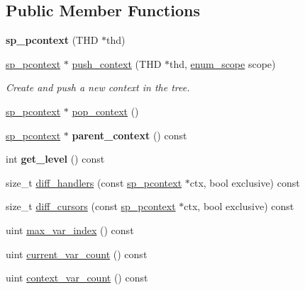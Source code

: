 \subsection*{Public Member Functions}
\begin{DoxyCompactItemize}
\item 
\mbox{\label{classsp__pcontext_a0185ee1d6e0b39b105e360779f46ae90}} 
{\bfseries sp\+\_\+pcontext} (T\+HD $\ast$thd)
\item 
\mbox{\hyperlink{classsp__pcontext}{sp\+\_\+pcontext}} $\ast$ \mbox{\hyperlink{classsp__pcontext_a486b4feb63c343fea40adcf197bde017}{push\+\_\+context}} (T\+HD $\ast$thd, \mbox{\hyperlink{classsp__pcontext_a6252258e34c191cbf1b5e86628cd29c6}{enum\+\_\+scope}} scope)
\begin{DoxyCompactList}\small\item\em Create and push a new context in the tree. \end{DoxyCompactList}\item 
\mbox{\hyperlink{classsp__pcontext}{sp\+\_\+pcontext}} $\ast$ \mbox{\hyperlink{classsp__pcontext_ae7e4af2bd11d58a2950462a490612a31}{pop\+\_\+context}} ()
\item 
\mbox{\label{classsp__pcontext_af7e13090fdd0afca3396677eb805ab63}} 
\mbox{\hyperlink{classsp__pcontext}{sp\+\_\+pcontext}} $\ast$ {\bfseries parent\+\_\+context} () const
\item 
\mbox{\label{classsp__pcontext_aad5e1160cd57d70ff16ee6aa8288744d}} 
int {\bfseries get\+\_\+level} () const
\item 
size\+\_\+t \mbox{\hyperlink{classsp__pcontext_ae47ee327ab468137d802f15dafe35206}{diff\+\_\+handlers}} (const \mbox{\hyperlink{classsp__pcontext}{sp\+\_\+pcontext}} $\ast$ctx, bool exclusive) const
\item 
size\+\_\+t \mbox{\hyperlink{classsp__pcontext_a1bed00024e865ddb21bfb40bd3383d70}{diff\+\_\+cursors}} (const \mbox{\hyperlink{classsp__pcontext}{sp\+\_\+pcontext}} $\ast$ctx, bool exclusive) const
\item 
uint \mbox{\hyperlink{classsp__pcontext_a8e102fc7e3bb76e872b32bb8783df72f}{max\+\_\+var\+\_\+index}} () const
\item 
uint \mbox{\hyperlink{classsp__pcontext_a368a6fdbad2b286956bd9e67cba15825}{current\+\_\+var\+\_\+count}} () const
\item 
uint \mbox{\hyperlink{classsp__pcontext_a2733cafaa598552f29d8780347040abc}{context\+\_\+var\+\_\+count}} () const

\end{DoxyCompactItemize}
